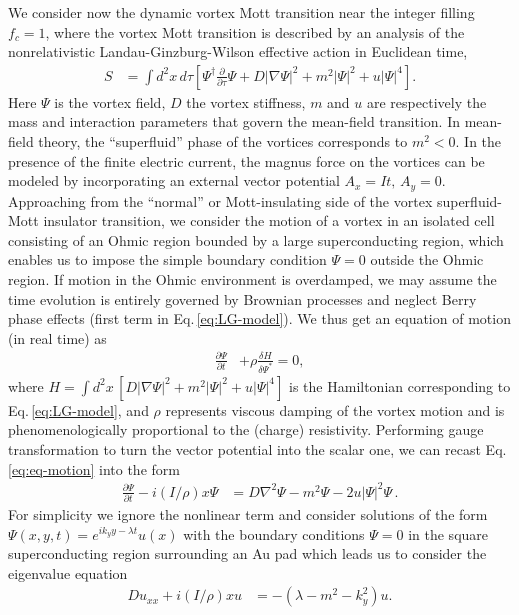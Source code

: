 \documentclass[aps,twocolumn,prl,10pt,amsmath,amssymb,nofootinbib,showpacs,superscriptaddress,floatfix]{revtex4-1}
\begin{document}
We consider now the dynamic vortex Mott transition near the integer
filling $f_{c}=1$, where the vortex Mott transition is described
by an analysis of the nonrelativistic Landau-Ginzburg-Wilson effective
action in Euclidean time, 
\begin{align}
	S & =\int d^{2}x\, d\tau\left[\Psi^{\dagger}\frac{\partial}{\partial\tau}\Psi+D|\nabla\Psi|^{2}+m^{2}|\Psi|^{2}+u|\Psi|^{4}\right].\label{eq:LG-model}
\end{align}
Here $\Psi$ is the vortex field, $D$ the vortex stiffness, $m$
and $u$ are respectively the mass and interaction parameters that
govern the mean-field transition. In mean-field theory, the ``superfluid''
phase of the vortices corresponds to $m^{2}<0.$ In the presence of
the finite electric current, the magnus force on the vortices can be
modeled by incorporating an external vector potential $A_{x}=It,\, A_{y}=0.$
Approaching from the ``normal'' or Mott-insulating side of the vortex
superfluid-Mott insulator transition, we consider the motion of a
vortex in an isolated cell consisting of an Ohmic region bounded by
a large superconducting region, which enables us to impose the simple
boundary condition $\Psi=0$ outside the Ohmic region. If motion in
the Ohmic environment is overdamped, we may assume the time evolution
is entirely governed by Brownian processes and neglect Berry phase
effects (first term in Eq.\,\eqref{eq:LG-model}). We thus get an equation
of motion (in real time) as 
\begin{align}
	\frac{\partial\Psi}{\partial t} & +\rho\frac{\delta H}{\delta\Psi^{*}}=0,\label{eq:eq-motion}
\end{align}
where $H=\int d^{2}x\,\left[D|\nabla\Psi|^{2}+m^{2}|\Psi|^{2}+u|\Psi|^{4}\right]$
is the Hamiltonian corresponding to Eq.\,\eqref{eq:LG-model}, and $\rho$
represents viscous damping of the vortex motion and is phenomenologically
proportional to the (charge) resistivity. Performing gauge transformation
to turn the vector potential into the scalar one, we can recast
Eq.\,\eqref{eq:eq-motion} into the form
\begin{align}
	\frac{\partial\Psi}{\partial t}-i(I/\rho)x\Psi & =D\nabla^{2}\Psi-m^{2}\Psi-2u|\Psi|^{2}\Psi\,.\label{eq:sch-eqn}
\end{align}
For simplicity we ignore the nonlinear term  and consider solutions
of the form $\Psi(x,y,t)=e^{ik_{y}y-\lambda t}u(x)$ with the boundary
conditions $\Psi=0$ in the square superconducting region surrounding
an Au pad which leads us to consider the eigenvalue equation
\begin{align}
	Du_{xx}+i(I/\rho)xu & =-(\lambda-m^{2}-k_{y}^{2})u.\label{eq:linearized}
\end{align}
\end{document}
